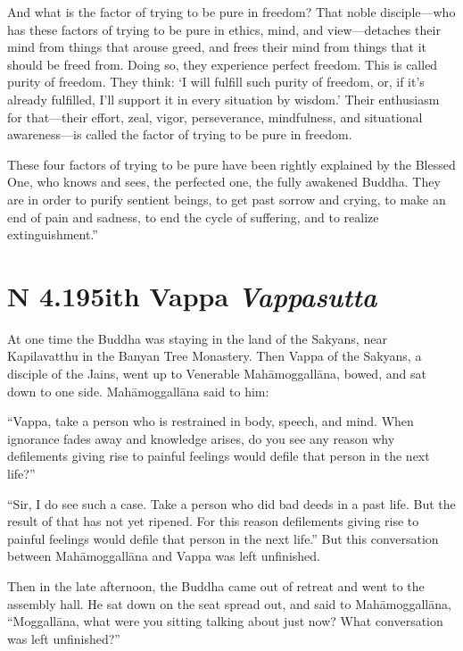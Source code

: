 \documentclass[12pt,openany]{book}%
\newcommand*{\suttatitleacronym}[1]{\smaller[2]{#1}\vspace*{.3em}}
\newcommand*{\suttatitletranslation}[1]{\linebreak{#1}}
\newcommand*{\suttatitleroot}[1]{\linebreak\smaller[2]\itshape{#1}}
\newcommand*{\tocacronym}[1]{\hspace*{-3.3em}{#1}\quad}
\newcommand*{\toctranslation}[1]{#1}
\newcommand*{\tocroot}[1]{(\textit{#1})}
\begin{document}
And what is the factor of trying to be pure in freedom? That noble disciple—who has these factors of trying to be pure in ethics, mind, and view—detaches their mind from things that arouse greed, and frees their mind from things that it should be freed from. Doing so, they experience perfect freedom. This is called purity of freedom. They think: ‘I will fulfill such purity of freedom, or, if it’s already fulfilled, I’ll support it in every situation by wisdom.’ Their enthusiasm for that—their effort, zeal, vigor, perseverance, mindfulness, and situational awareness—is called the factor of trying to be pure in freedom. 

These four factors of trying to be pure have been rightly explained by the Blessed One, who knows and sees, the perfected one, the fully awakened Buddha. They are in order to purify sentient beings, to get past sorrow and crying, to make an end of pain and sadness, to end the cycle of suffering, and to realize extinguishment.” 

%
\section*{{\suttatitleacronym AN 4.195}{\suttatitletranslation With Vappa }{\suttatitleroot Vappasutta}}
\addcontentsline{toc}{section}{\tocacronym{AN 4.195} \toctranslation{With Vappa } \tocroot{Vappasutta}}

At one time the Buddha was staying in the land of the Sakyans, near Kapilavatthu in the Banyan Tree Monastery. Then Vappa of the Sakyans, a disciple of the Jains, went up to Venerable \textsanskrit{Mahāmoggallāna}, bowed, and sat down to one side. \textsanskrit{Mahāmoggallāna} said to him: 

“Vappa, take a person who is restrained in body, speech, and mind. When ignorance fades away and knowledge arises, do you see any reason why defilements giving rise to painful feelings would defile that person in the next life?” 

“Sir, I do see such a case. Take a person who did bad deeds in a past life. But the result of that has not yet ripened. For this reason defilements giving rise to painful feelings would defile that person in the next life.” But this conversation between \textsanskrit{Mahāmoggallāna} and Vappa was left unfinished. 

Then in the late afternoon, the Buddha came out of retreat and went to the assembly hall. He sat down on the seat spread out, and said to \textsanskrit{Mahāmoggallāna}, “\textsanskrit{Moggallāna}, what were you sitting talking about just now? What conversation was left unfinished?” 
\end{document}
